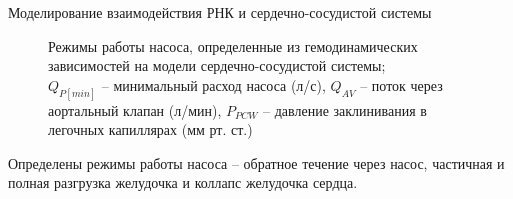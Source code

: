 \documentclass[a4paper, 9pt]{beamer}
\begin{document}

\begin{frame}{Моделирование взаимодействия РНК и сердечно-сосудистой системы}

\begin{minipage}[ht]{0.34\textwidth}
\scriptsize

\begin{figure}
\caption{\scriptsize Режимы работы насоса, определенные из гемодинамических зависимостей на модели сердечно-сосудистой системы; \\ \tiny $Q_{P[min]}$ -- минимальный расход насоса (л/с), $Q_{AV}$ -- поток через аортальный клапан (л/мин), $P_{PCW}$ -- давление заклинивания в легочных капиллярах (мм рт. ст.)}
\end{figure}

Определены режимы работы насоса -- обратное течение через насос, частичная и полная разгрузка желудочка и коллапс желудочка сердца. %

\end{minipage}
\hfill
\begin{minipage}[ht]{0.64\textwidth}
\scriptsize


\end{minipage}
\end{frame}
\end{document}
